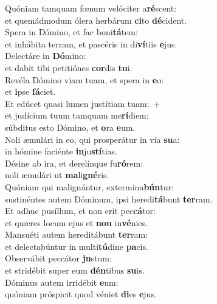 \evenverse Quóniam tamquam fœnum velóciter a\textbf{ré}scent:~\*\\
\evenverse et quemádmodum ólera herbárum \textbf{ci}to \textbf{dé}cident.\\
\oddverse Spera in Dómino, et fac boni\textbf{tá}tem:~\*\\
\oddverse et inhábita terram, et pascéris in di\textbf{ví}tiis \textbf{e}jus.\\
\evenverse Delectáre in \textbf{Dó}mino:~\*\\
\evenverse et dabit tibi petitiónes \textbf{cor}dis \textbf{tu}i.\\
\oddverse Revéla Dómino viam tuam, et spera in \textbf{e}o:~\*\\
\oddverse et \textbf{i}pse \textbf{fá}ciet.\\
\evenverse Et edúcet quasi lumen justítiam tuam:~+\\
\evenverse  et judícium tuum tamquam me\textbf{rí}diem:~\*\\
\evenverse súbditus esto Dómino, et \textbf{o}ra \textbf{e}um.\\
\oddverse Noli æmulári in eo, qui prosperátur in via \textbf{su}a:~\*\\
\oddverse in hómine faciénte \textbf{in}ju\textbf{stí}tias.\\
\evenverse Désine ab ira, et derelínque fu\textbf{ró}rem:~\*\\
\evenverse noli æmulári ut \textbf{ma}li\textbf{gné}ris.\\
\oddverse Quóniam qui malignántur, extermina\textbf{bún}tur:~\*\\
\oddverse sustinéntes autem Dóminum, ipsi heredi\textbf{tá}bunt \textbf{ter}ram.\\
\evenverse Et adhuc pusíllum, et non erit pec\textbf{cá}tor:~\*\\
\evenverse et quæres locum ejus et \textbf{non} in\textbf{vé}nies.\\
\oddverse Mansuéti autem hereditábunt \textbf{ter}ram:~\*\\
\oddverse et delectabúntur in multi\textbf{tú}dine \textbf{pa}cis.\\
\evenverse Observábit peccátor \textbf{ju}stum:~\*\\
\evenverse et stridébit super eum \textbf{dén}tibus \textbf{su}is.\\
\oddverse Dóminus autem irridébit \textbf{e}um:~\*\\
\oddverse quóniam próspicit quod véniet \textbf{di}es \textbf{e}jus.\\
